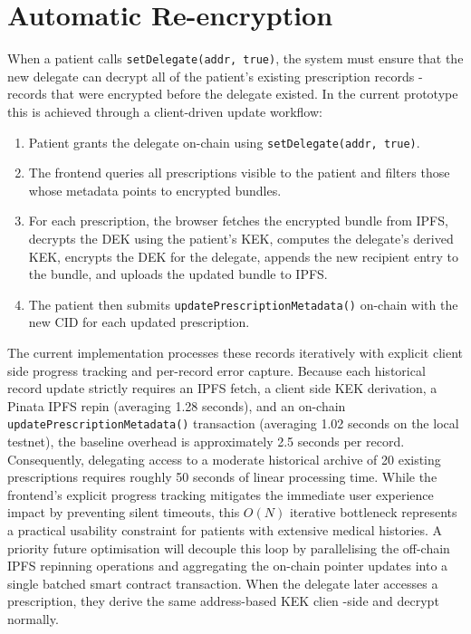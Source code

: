 \documentclass[12pt,a4wide]{report}
\begin{document}
\section{Automatic Re-encryption}

When a patient calls \texttt{setDelegate(addr, true)}, the system must ensure
that the new delegate can decrypt all of the patient's existing prescription
records - records that were encrypted before the delegate existed. In the current
prototype this is achieved through a client-driven update workflow:

\begin{enumerate}
  \item Patient grants the delegate on-chain using \texttt{setDelegate(addr, true)}.
  \item The frontend queries all prescriptions visible to the patient and filters
    those whose metadata points to encrypted bundles.
  \item For each prescription, the browser fetches the encrypted bundle from IPFS,
    decrypts the DEK using the patient's KEK, computes the delegate's derived KEK,
    encrypts the DEK for the delegate, appends the new recipient entry to the bundle,
    and uploads the updated bundle to IPFS.
  \item The patient then submits \texttt{updatePrescriptionMetadata()} on-chain
    with the new CID for each updated prescription.
\end{enumerate}

The current implementation processes these records iteratively with explicit client side progress tracking and per-record error capture. Because each historical record update strictly requires an IPFS fetch, a client side KEK derivation, a Pinata IPFS repin (averaging 1.28 seconds), and an on-chain \texttt{updatePrescriptionMetadata()} transaction (averaging 1.02 seconds on the local testnet), the baseline overhead is approximately 2.5 seconds per record. Consequently, delegating access to a moderate historical archive of 20 existing prescriptions requires roughly 50 seconds of linear processing time. While the frontend's explicit progress tracking mitigates the immediate user experience impact by preventing silent timeouts, this $O(N)$ iterative bottleneck represents a practical usability constraint for patients with extensive medical histories. A priority future optimisation will decouple this loop by parallelising the off-chain IPFS repinning operations and aggregating the on-chain pointer updates into a single batched smart contract transaction. When the delegate later accesses a prescription, they derive the same address-based KEK clien -side and decrypt normally.
\end{document}
